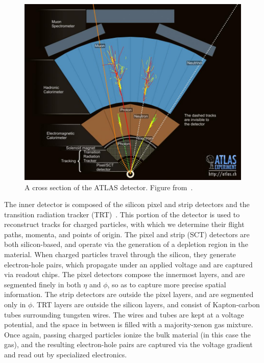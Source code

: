 \begin{figure}[htbp]
    \centering
    \includegraphics[width=\linewidth]{Images/ATLAS/ATLAS_cross_section.jpg}
    \caption{A cross section of the ATLAS detector. Figure from~\cite{ATLAS_cross_section}.}
    \label{fig:ATLAS_cross_section}
\end{figure}

The inner detector is composed of the silicon pixel and strip detectors and the transition radiation tracker (TRT)~\cite{ATLAS_inner_detector_TDR}. This portion of the detector is used to reconstruct tracks for charged particles, with which we determine their flight paths, momenta, and points of origin. The pixel and strip (SCT) detectors are both silicon-based, and operate via the generation of a depletion region in the material. When charged particles travel through the silicon, they generate electron-hole pairs, which propagate under an applied voltage and are captured via readout chips. The pixel detectors compose the innermost layers, and are segmented finely in both $\eta$ and $\phi$, so as to capture more precise spatial information. The strip detectors are outside the pixel layers, and are segmented only in $\phi$. TRT layers are outside the silicon layers, and consist of Kapton-carbon tubes surrounding tungsten wires. The wires and tubes are kept at a voltage potential, and the space in between is filled with a majority-xenon gas mixture. Once again, passing charged particles ionize the bulk material (in this case the gas), and the resulting electron-hole pairs are captured via the voltage gradient and read out by specialized electronics.

